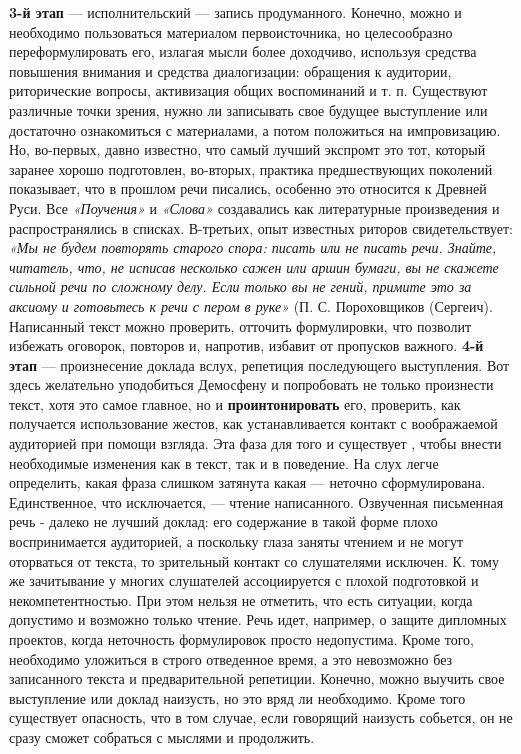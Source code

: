  \textbf{3-й этап} — исполнительский — запись продуманного. Конечно, можно и необходимо пользоваться материалом первоисточника, но целесообразно переформулировать его, излагая мысли более доходчиво, используя средства повышения внимания и средства диалогизации: обращения к аудитории, риторические вопросы, активизация общих воспоминаний и т. п. Существуют различные точки зрения, нужно ли записывать свое будущее выступление или достаточно ознакомиться с материалами, а потом положиться на импровизацию. Но, во-первых, давно известно, что самый лучший экспромт это тот, который заранее хорошо подготовлен, во-вторых, практика предшествующих поколений показывает, что в прошлом речи писались, особенно это относится к Древней Руси. Все \textit{«Поучения»} и \textit{«Слова»} создавались как литературные произведения и распространялись в списках. В-третьих, опыт известных риторов свидетельствует: \textit{«Мы не будем повторять старого спора: писать или не писать речи. Знайте, читатель, что, не исписав несколько сажен или аршин бумаги, вы не скажете сильной речи по сложному делу. Если только вы не гений, примите это за аксиому и готовьтесь к речи с пером в руке»} (П. С. Пороховщиков (Сергеич). Написанный текст можно проверить, отточить формулировки, что позволит избежать оговорок, повторов и, напротив, избавит от пропусков важного. \textbf{4-й этап} — произнесение доклада вслух, репетиция последующего выступления. Вот здесь желательно уподобиться Демосфену и попробовать не только произнести текст, хотя это самое главное, но и \textbf{проинтонировать} его, проверить, как получается использование жестов, как устанавливается контакт с воображаемой аудиторией при помощи взгляда. Эта фаза для того и существует , чтобы внести необходимые изменения как в текст, так и в поведение. На слух легче определить, какая фраза слишком затянута какая — неточно сформулирована. Единственное, что исключается, — чтение написанного. Озвученная письменная речь - далеко не лучший доклад: его содержание в такой форме плохо воспринимается аудиторией, а поскольку глаза заняты чтением и не могут оторваться от текста, то зрительный контакт со  слушателями исключен. К. тому же зачитывание у многих слушателей ассоциируется с плохой подготовкой и некомпетентностью. При этом нельзя не отметить, что есть ситуации, когда допустимо и возможно только чтение. Речь идет, например, о защите дипломных проектов, когда неточность формулировок просто недопустима. Кроме того, необходимо уложиться в строго отведенное время, а это невозможно без записанного текста и предварительной репетиции. Конечно, можно выучить свое выступление или доклад наизусть, но это вряд ли необходимо. Кроме того существует опасность, что в том случае, если говорящий наизусть собьется, он не сразу сможет собраться с мыслями и продолжить.

